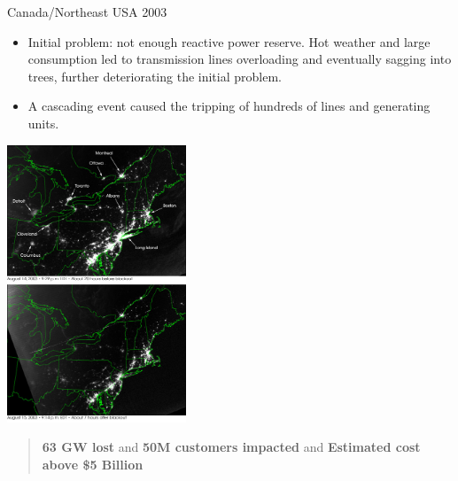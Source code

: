 \begin{frame}{Canada/Northeast USA 2003}
\begin{itemize}
    \item Initial problem: not enough reactive power reserve. Hot weather and large consumption led to transmission lines overloading and eventually sagging into trees, further deteriorating the initial problem.
    \item A cascading event caused the tripping of hundreds of lines and generating units.
\end{itemize}
\vspace{0.5cm}
\begin{center}
\includegraphics[width=0.4\textwidth]{images/USABlackOut.png}
\end{center}
\vspace{0.5cm}
\begin{quote}
    \textbf{63 GW lost} and \textbf{50M customers impacted} and \textbf{Estimated cost above \$5 Billion}
\end{quote}
\end{frame}

